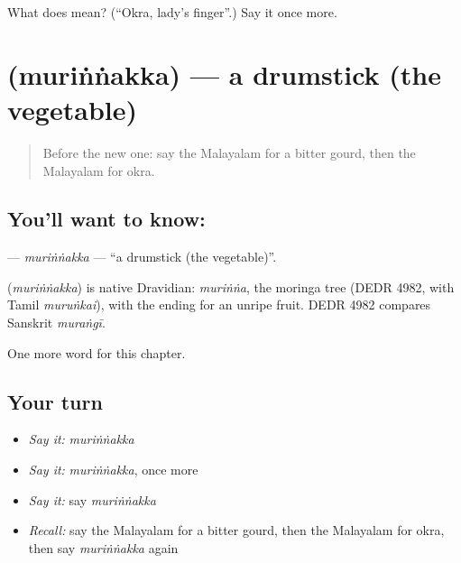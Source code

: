 \begin{tcolorbox}[breakable,colback=teal!4,colframe=teal!35!black,title={Before you move on}]
What does  mean? (\textquotedblleft{}Okra, lady's finger\textquotedblright{}.) Say it once more.
\end{tcolorbox}
\section[\texorpdfstring{\ml{മുരിങ്ങക്ക} (muriṅṅakka)}{മുരിങ്ങക്ക (muriṅṅakka)}]{ (muriṅṅakka) — a drumstick (the vegetable)}

\label{lesson:ML-C259-murinnakka}



\begin{quote}
Before the new one: say the Malayalam for a bitter gourd, then the Malayalam for okra.
\end{quote}

\subsection*{You'll want to know: }
\textbf{} — \emph{muriṅṅakka} — \textquotedblleft{}a drumstick (the vegetable)\textquotedblright{}.

\begin{cousinweb}
\textbf{} (\emph{muriṅṅakka}) is native Dravidian: \emph{muriṅṅa}, the moringa tree (DEDR 4982, with Tamil \emph{muruṅkai}), with the ending for an unripe fruit. DEDR 4982 compares Sanskrit \emph{muraṅgī}.
\end{cousinweb}

\begin{grammarlens}[title={What you've built}]
One more word for this chapter.
\end{grammarlens}

\subsection*{Your turn}
\begin{itemize}
\raggedright
  \item \emph{Say it:} \emph{muriṅṅakka}
  \item \emph{Say it:} \emph{muriṅṅakka}, once more
  \item \emph{Say it:} say \emph{muriṅṅakka}
  \item \emph{Recall:} say the Malayalam for a bitter gourd, then the Malayalam for okra, then say \emph{muriṅṅakka} again
\end{itemize}

